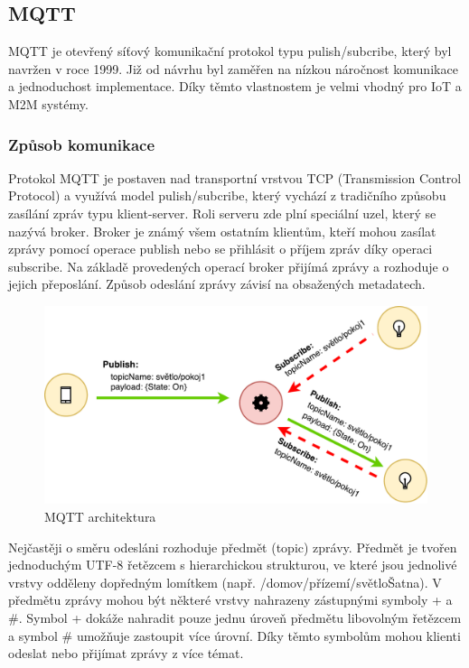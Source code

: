 \subsection{MQTT}
  MQTT je otevřený síťový komunikační protokol typu pulish/subcribe, který byl navržen
  v roce 1999. Již od návrhu byl zaměřen na nízkou náročnost komunikace a jednoduchost
  implementace. Díky těmto vlastnostem je velmi vhodný pro IoT a M2M systémy. \cite{mqtt}
  \subsubsection{Způsob komunikace}
  
  Protokol MQTT je postaven nad transportní vrstvou TCP (Transmission Control Protocol)
  a využívá model pulish/subcribe, který vychází z tradičního způsobu zasílání zpráv
  typu klient-server. Roli serveru zde plní speciální uzel, který se nazývá broker.
  Broker je známý všem ostatním klientům, kteří mohou zasílat zprávy pomocí operace
  publish nebo se přihlásit o příjem zpráv díky operaci subscribe.
  Na základě provedených operací broker přijímá zprávy a rozhoduje o jejich přeposlání.
  Způsob odeslání zprávy závisí na obsažených metadatech.
  
\begin{figure}[ht]
\begin{center}
\includegraphics[scale=0.41]{pictures/mqtt-arch}
\caption{MQTT architektura}
\label{obr.mqtt-arch}
\end{center}
\end{figure}
  
  Nejčastěji o směru odesláni rozhoduje předmět (topic) zprávy. Předmět je tvořen
  jednoduchým UTF-8 řetězcem s hierarchickou strukturou, ve které jsou jednolivé
  vrstvy odděleny dopředným lomítkem (např. /domov/přízemí/světloŠatna). V předmětu
  zprávy mohou být některé vrstvy nahrazeny zástupnými symboly + a \#. Symbol + dokáže
  nahradit pouze jednu úroveň předmětu libovolným řetězcem a symbol \# umožňuje
  zastoupit více úrovní. Díky těmto symbolům mohou klienti odeslat nebo přijímat
  zprávy z více témat.
  

